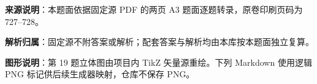 


\begin{gknotice}
\textbf{来源说明}：本题面依据固定源 PDF 的两页 A3 题面逐题转录，原卷印刷页码为 727–728。

\textbf{解析归属}：固定源不附答案或解析；配套答案与解析均由本库按本题面独立复算。

\textbf{图形说明}：第 19 题立体图由项目内 TikZ 矢量源重绘。下列 Markdown 使用逻辑 PNG 标记供后续生成器映射，仓库不保存 PNG。
\end{gknotice}


